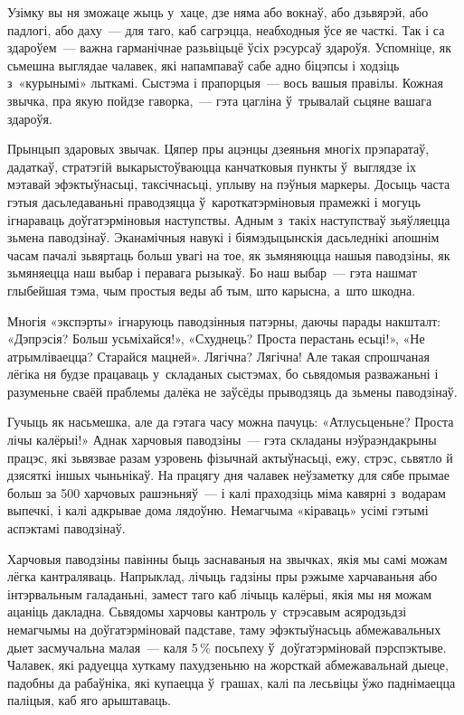 Узімку вы ня зможаце жыць у~хаце, дзе няма або вокнаў, або дзьвярэй, або падлогі, або даху~--- для таго, каб сагрэцца, неабходныя ўсе яе часткі. Так і са здароўем~--- важна гарманічнае разьвіцьцё ўсіх рэсурсаў здароўя. Успомніце, як сьмешна выглядае чалавек, які напампаваў сабе адно біцэпсы і ходзіць з~«курынымі» лыткамі. Сыстэма і прапорцыя~--- вось вашыя правілы. Кожная звычка, пра якую пойдзе гаворка,~--- гэта цагліна ў~трывалай сьцяне вашага здароўя.

Прынцып здаровых звычак. Цяпер пры ацэнцы дзеяньня многіх прэпаратаў, дадаткаў, стратэгій выкарыстоўваюцца канчатковыя пункты ў~выглядзе іх мэтавай эфэктыўнасьці, таксічнасьці, уплыву на пэўныя маркеры. Досыць часта гэтыя дасьледаваньні праводзяцца ў~кароткатэрміновыя прамежкі і могуць ігнараваць доўгатэрміновыя наступствы. Адным з~такіх наступстваў зьяўляецца зьмена паводзінаў. Эканамічныя навукі і біямэдыцынскія дасьледнікі апошнім часам пачалі зьвяртаць больш увагі на тое, як зьмяняюцца нашыя паводзіны, як зьмяняецца наш выбар і перавага рызыкаў. Бо наш выбар~--- гэта нашмат глыбейшая тэма, чым простыя веды аб тым, што карысна, а~што шкодна.

Многія «экспэрты» ігнаруюць паводзінныя патэрны, даючы парады накшталт: «Дэпрэсія? Больш усьміхайся!», «Схуднець? Проста перастань есьці!», «Не атрымліваецца? Старайся мацней». Лягічна? Лягічна! Але такая спрошчаная лёгіка ня будзе працаваць у~складаных сыстэмах, бо сьвядомыя разважаньні і разуменьне сваёй праблемы далёка не заўсёды прыводзяць да зьмены паводзінаў.

Гучыць як насьмешка, але да гэтага часу можна пачуць: «Атлусьценьне? Проста лічы калёрыі!» Аднак харчовыя паводзіны~--- гэта складаны нэўраэндакрыны працэс, які зьвязвае разам узровень фізычнай актыўнасьці, ежу, стрэс, сьвятло й дзясяткі іншых чыньнікаў. На працягу дня чалавек неўзаметку для сябе прымае больш за 500 харчовых рашэньняў~--- і калі праходзіць міма кавярні з~водарам выпечкі, і калі адкрывае дома лядоўню. Немагчыма «кіраваць» усімі гэтымі аспэктамі паводзінаў.

Харчовыя паводзіны павінны быць заснаваныя на звычках, якія мы самі можам лёгка кантраляваць. Напрыклад, лічыць гадзіны пры рэжыме харчаваньня або інтэрвальным галаданьні, замест таго каб лічыць калёрыі, якія мы ня можам ацаніць дакладна. Сьвядомы харчовы кантроль у~стрэсавым асяродзьдзі немагчымы на доўгатэрміновай падставе, таму эфэктыўнасьць абмежавальных дыет засмучальна малая~--- каля 5\,\% посьпеху ў~доўгатэрміновай пэрспэктыве. Чалавек, які радуецца хуткаму пахудзеньню на жорсткай абмежавальнай дыеце, падобны да рабаўніка, які купаецца ў~грашах, калі па лесьвіцы ўжо паднімаецца паліцыя, каб яго арыштаваць.

